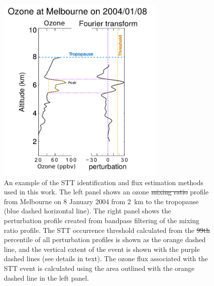 \documentclass[acp, manuscript]{copernicus} %
\providecommand{\DIFadd}[1]{{\protect\color{blue}\uwave{#1}}} %
\providecommand{\DIFdel}[1]{{\protect\color{red}\sout{#1}}}                      %
\providecommand{\DIFaddFL}[1]{\DIFadd{#1}} %
\providecommand{\DIFdelFL}[1]{\DIFdel{#1}} %
\providecommand{\DIFaddbeginFL}{} %
\providecommand{\DIFaddendFL}{} %
\providecommand{\DIFdelbeginFL}{} %
\providecommand{\DIFdelendFL}{} %
\begin{document}
    \begin{figure}[t]
      \includegraphics[width=8.3cm]{figures/filtereg.png}
      \caption{ %
	An example of the STT identification and flux estimation methods used in this work. 
	The left panel shows an ozone \DIFdelbeginFL \DIFdelFL{mixing ratio }\DIFdelendFL profile from Melbourne on 8 January 2004 from 2~km to the tropopause (blue dashed horizontal line).
	The right panel shows the perturbation profile created from bandpass filtering of the mixing ratio profile. The STT occurrence threshold calculated from the \DIFdelbeginFL \DIFdelFL{99th }\DIFdelendFL \DIFaddbeginFL \DIFaddFL{95th }\DIFaddendFL percentile of all perturbation profiles is shown as the orange dashed line, and the vertical extent of the event is shown with the purple dashed lines (see details in text).
	The ozone flux associated with the STT event is calculated using the area outlined with the orange dashed line in the left panel.
      }
      \label{fig:filterEG}
    \end{figure}
\end{document}
